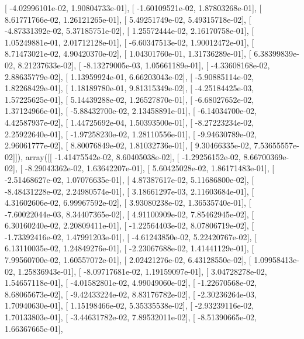 \documentclass{article}
\begin{document}
       [ -4.02996101e-02,   1.90804733e-01],
       [ -1.60109521e-02,   1.87803268e-01],
       [  8.61771766e-02,   1.26121265e-01],
       [  5.49251749e-02,   5.49315718e-02],
       [ -4.87331392e-02,   5.37185751e-02],
       [  1.25572444e-02,   2.16170758e-01],
       [  1.05249881e-01,   2.01712128e-01],
       [ -6.60347513e-02,   1.90012472e-01],
       [  8.71473021e-02,   4.90420370e-02],
       [  1.04301760e-01,   1.31736289e-01],
       [  6.38399839e-02,   8.21237633e-02],
       [ -8.13279005e-03,   1.05661189e-01],
       [ -4.33608168e-02,   2.88635779e-02],
       [  1.13959924e-01,   6.66203043e-02],
       [ -5.90885114e-02,   1.82268429e-01],
       [  1.18189780e-01,   9.81315349e-02],
       [ -4.25184425e-03,   1.57225625e-01],
       [  5.14439288e-02,   1.26527870e-01],
       [ -6.68027652e-02,   1.37124966e-01],
       [ -5.88432700e-02,   2.13458891e-01],
       [ -6.14034700e-02,   4.42587937e-02],
       [  1.44725692e-04,   1.50393500e-01],
       [ -8.27223234e-02,   2.25922640e-01],
       [ -1.97258230e-02,   1.28110556e-01],
       [ -9.94630789e-02,   2.96061777e-02],
       [  8.80076849e-02,   1.81032736e-01],
       [  9.30466335e-02,   7.53655557e-02]]), array([[ -1.41475542e-02,   8.60405038e-02],
       [ -1.29256152e-02,   8.66700369e-02],
       [ -8.29043362e-02,   1.63642207e-01],
       [  5.60425028e-02,   1.86171483e-01],
       [ -2.51468627e-02,   1.07076635e-01],
       [  4.87387617e-02,   5.11686800e-02],
       [ -8.48431228e-02,   2.24980574e-01],
       [  3.18661297e-03,   2.11603684e-01],
       [  4.31602606e-02,   6.99967592e-02],
       [  3.93080238e-02,   1.36535740e-01],
       [ -7.60022044e-03,   8.34407365e-02],
       [  4.91100909e-02,   7.85462945e-02],
       [  6.30160240e-02,   2.20809411e-01],
       [ -1.22564403e-02,   8.07806719e-02],
       [ -1.73392416e-02,   1.47991203e-01],
       [ -4.61243850e-02,   5.22420767e-02],
       [  6.13110035e-02,   1.24849276e-01],
       [ -2.23067688e-02,   1.41441129e-01],
       [  7.99560700e-02,   1.60557072e-01],
       [  2.02421276e-02,   6.43128550e-02],
       [  1.09958413e-02,   1.25836943e-01],
       [ -8.09717681e-02,   1.19159097e-01],
       [  3.04728278e-02,   1.54657118e-01],
       [ -4.01582801e-02,   4.99049060e-02],
       [ -1.22670568e-02,   8.68065673e-02],
       [ -9.42433224e-02,   8.83176782e-02],
       [ -2.30236264e-03,   1.70940630e-01],
       [  1.15198466e-02,   5.35335538e-02],
       [ -2.93239116e-02,   1.70133803e-01],
       [ -3.44631782e-02,   7.89532011e-02],
       [ -8.51390665e-02,   1.66367665e-01],
\end{document}
